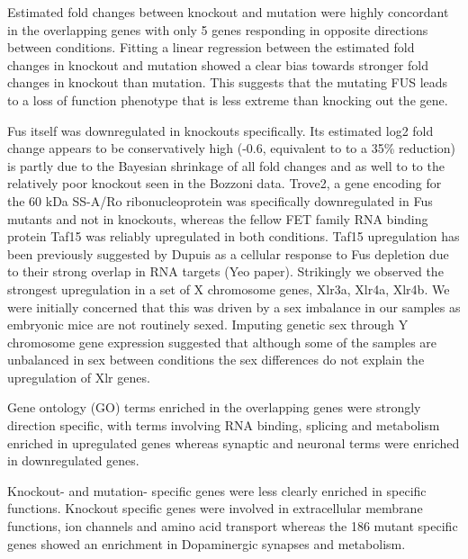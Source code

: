Estimated fold changes between knockout and mutation were highly concordant in the overlapping genes with only 5 genes responding in opposite directions between conditions. Fitting a linear regression between the estimated fold changes in knockout and mutation showed a clear bias towards stronger fold changes in knockout than mutation. 
This suggests that the mutating FUS leads to a loss of function phenotype that is less extreme than knocking out the gene.

Fus itself was downregulated in knockouts specifically. Its estimated log2 fold change appears to be conservatively high (-0.6, equivalent to to a 35\% reduction) is partly due to the Bayesian shrinkage of all fold changes and as well to to the relatively poor knockout seen in the Bozzoni data. Trove2, a gene encoding for the 60 kDa SS-A/Ro ribonucleoprotein was specifically downregulated in Fus mutants and not in knockouts, whereas the fellow FET family RNA binding protein Taf15 was reliably upregulated in both conditions. Taf15 upregulation has been previously suggested by Dupuis as a cellular response to Fus depletion due to their strong overlap in RNA targets (Yeo paper). Strikingly we observed the strongest upregulation in a set of X chromosome genes, Xlr3a, Xlr4a, Xlr4b. We were initially concerned that this was driven by a sex imbalance in our samples as embryonic mice are not routinely sexed. Imputing genetic sex through Y chromosome gene expression suggested that although some of the samples are unbalanced in sex between conditions the sex differences do not explain the upregulation of Xlr genes.

Gene ontology (GO) terms enriched in the overlapping genes were strongly direction specific, with terms involving RNA binding, splicing and metabolism enriched in upregulated genes whereas synaptic and neuronal terms were enriched in downregulated genes.

Knockout- and mutation- specific genes were less clearly enriched in specific functions. Knockout specific genes were involved in extracellular membrane functions, ion channels and amino acid transport whereas the 186 mutant specific genes showed an enrichment in Dopaminergic synapses and metabolism.

